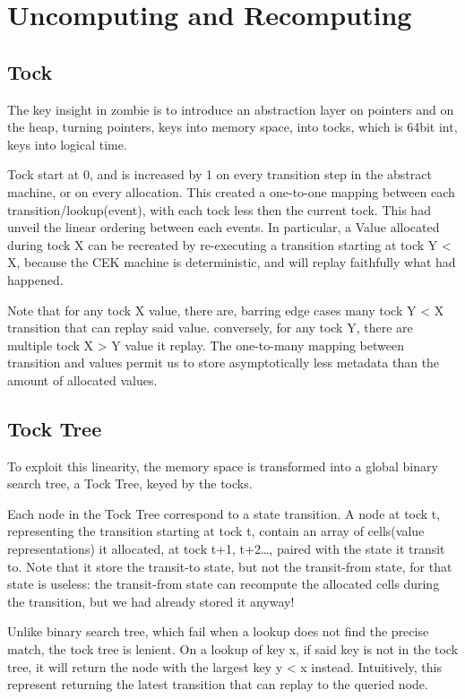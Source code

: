 \section{Uncomputing and Recomputing}
\subsection{Tock}
The key insight in zombie is to introduce an abstraction layer on pointers and on the heap, turning pointers, keys into memory space, into tocks, which is 64bit int, keys into logical time.

Tock start at 0, and is increased by 1 on every transition step in the abstract machine, or on every allocation. This created a one-to-one mapping between each transition/lookup(event), with each tock less then the current tock. This had unveil the linear ordering between each events. In particular, a Value allocated during tock X can be recreated by re-executing a transition starting at tock Y < X, because the CEK machine is deterministic, and will replay faithfully what had happened.

Note that for any tock X value, there are, barring edge cases many tock Y < X transition that can replay said value. conversely, for any tock Y, there are multiple tock X > Y value it replay. The one-to-many mapping between transition and values permit us to store asymptotically less metadata than the amount of allocated values.

\subsection{Tock Tree}
To exploit this linearity, the memory space is transformed into a global binary search tree, a Tock Tree, keyed by the tocks.

Each node in the Tock Tree correspond to a state transition. A node at tock t, representing the transition starting at tock t, contain an array of cells(value representations) it allocated, at tock t+1, t+2\dots, paired with the state it transit to. Note that it store the transit-to state, but not the transit-from state, for that state is useless: the transit-from state can recompute the allocated cells during the transition, but we had already stored it anyway!

Unlike binary search tree, which fail when a lookup does not find the precise match, the tock tree is lenient. On a lookup of key x, if said key is not in the tock tree, it will return the node with the largest key y < x instead. Intuitively, this represent returning the latest transition that can replay to the queried node.

